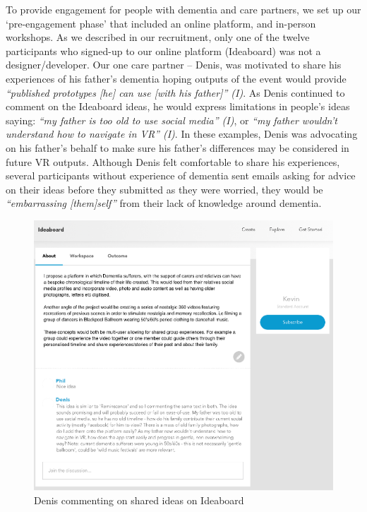 To provide engagement for people with dementia and care partners, we set up our ‘pre-engagement phase’ that included an online platform, and in-person workshops. As we described in our recruitment, only one of the twelve participants who signed-up to our online platform (Ideaboard) was not a designer/developer. Our one care partner – Denis, was motivated to share his experiences of his father’s dementia hoping outputs of the event would provide \textit{“published prototypes [he] can use [with his father]” (I)}. As Denis continued to comment on the Ideaboard ideas, he would express limitations in people’s ideas saying:\textit{ “my father is too old to use social media” (I)}, or \textit{“my father wouldn’t understand how to navigate in VR” (I)}. In these examples, Denis was advocating on his father’s behalf to make sure his father’s differences may be considered in future VR outputs. Although Denis felt comfortable to share his experiences, several participants without experience of dementia sent emails asking for advice on their ideas before they submitted as they were worried, they would be \textit{“embarrassing [them]self”} from their lack of knowledge around dementia. 

\begin{figure}[htp]
\centering
\includegraphics[width=.8\linewidth]{Images/DemVR/Findings/IdeaboardDemVR.png}
\caption{Denis commenting on shared ideas on Ideaboard}
\label{fig:DenisIdeaboard}
\end{figure}

